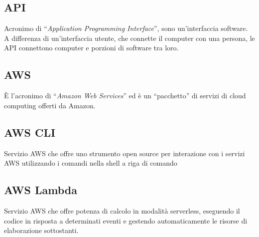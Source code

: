 \subsection{API}
Acronimo di “\textit{Application Programming Interface}”, sono un’interfaccia software. A differenza di un’interfaccia utente, che connette il computer con una persona, le API connettono computer e porzioni di software tra loro.


\subsection{AWS}
È l’acronimo di “\textit{Amazon Web Services}” ed è un “pacchetto” di servizi di cloud computing offerti da Amazon. 


\subsection{AWS CLI}
Servizio AWS che offre uno strumento open source per interazione con i servizi AWS utilizzando i comandi nella shell a riga di comando


\subsection{AWS Lambda}
Servizio AWS che offre potenza di calcolo in modalità serverless, eseguendo il codice in risposta a determinati eventi e gestendo automaticamente le risorse di elaborazione sottostanti. 



\clearpage 